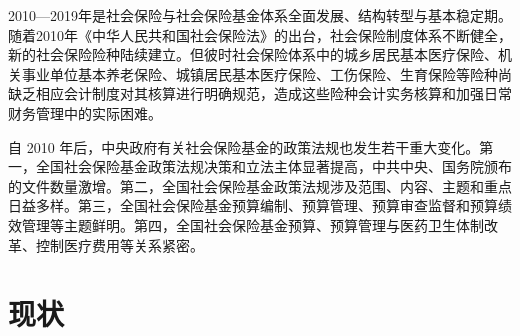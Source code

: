 \documentclass{ctexart}
\begin{document}
2010—2019年是社会保险与社会保险基金体系全面发展、结构转型与基本稳定期。随着2010年《中华人民共和国社会保险法》的出台，社会保险制度体系不断健全，新的社会保险险种陆续建立。但彼时社会保险体系中的城乡居民基本医疗保险、机关事业单位基本养老保险、城镇居民基本医疗保险、工伤保险、生育保险等险种尚缺乏相应会计制度对其核算进行明确规范，造成这些险种会计实务核算和加强日常财务管理中的实际困难。

自 2010 年后，中央政府有关社会保险基金的政策法规也发生若干重大变化。第一，全国社会保险基金政策法规决策和立法主体显著提高，中共中央、国务院颁布的文件数量激增。第二，全国社会保险基金政策法规涉及范围、内容、主题和重点日益多样。第三，全国社会保险基金预算编制、预算管理、预算审查监督和预算绩效管理等主题鲜明。第四，全国社会保险基金预算、预算管理与医药卫生体制改革、控制医疗费用等关系紧密。
\section{现状}
\end{document}
